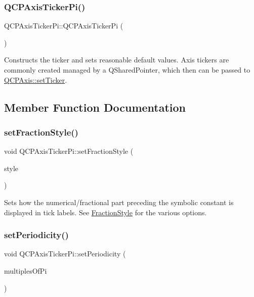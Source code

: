 \subsubsection{\texorpdfstring{Q\+C\+P\+Axis\+Ticker\+Pi()}{QCPAxisTickerPi()}}
{\footnotesize\ttfamily Q\+C\+P\+Axis\+Ticker\+Pi\+::\+Q\+C\+P\+Axis\+Ticker\+Pi (\begin{DoxyParamCaption}{ }\end{DoxyParamCaption})}

Constructs the ticker and sets reasonable default values. Axis tickers are commonly created managed by a Q\+Shared\+Pointer, which then can be passed to \hyperlink{class_q_c_p_axis_a4ee03fcd2c74d05cd1a419b9af5cfbdc}{Q\+C\+P\+Axis\+::set\+Ticker}. 

\subsection{Member Function Documentation}
\mbox{\label{class_q_c_p_axis_ticker_pi_a760c8af6ca68178e607556c4e5049d71}} 
\subsubsection{\texorpdfstring{set\+Fraction\+Style()}{setFractionStyle()}}
{\footnotesize\ttfamily void Q\+C\+P\+Axis\+Ticker\+Pi\+::set\+Fraction\+Style (\begin{DoxyParamCaption}\item[{\hyperlink{class_q_c_p_axis_ticker_pi_a262f1534c7f0c79a7d5237f5d1e2c54c}{Q\+C\+P\+Axis\+Ticker\+Pi\+::\+Fraction\+Style}}]{style }\end{DoxyParamCaption})}

Sets how the numerical/fractional part preceding the symbolic constant is displayed in tick labels. See \hyperlink{class_q_c_p_axis_ticker_pi_a262f1534c7f0c79a7d5237f5d1e2c54c}{Fraction\+Style} for the various options. \mbox{\label{class_q_c_p_axis_ticker_pi_a58f538dc01860fb56e46970e28a87f03}} 
\subsubsection{\texorpdfstring{set\+Periodicity()}{setPeriodicity()}}
{\footnotesize\ttfamily void Q\+C\+P\+Axis\+Ticker\+Pi\+::set\+Periodicity (\begin{DoxyParamCaption}\item[{int}]{multiples\+Of\+Pi }\end{DoxyParamCaption})}

